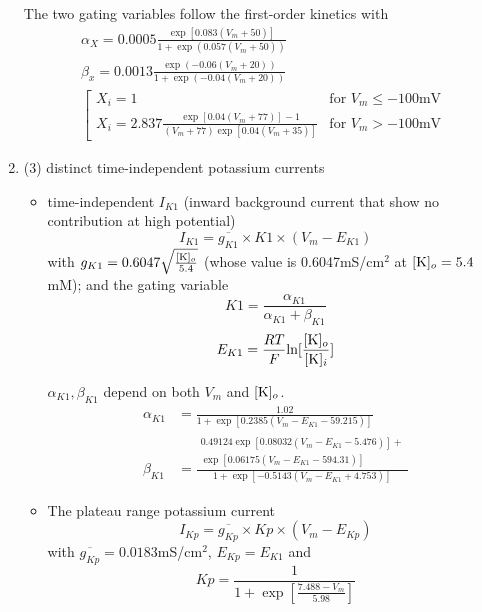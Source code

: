 \begin{enumerate}
  The two gating variables follow the first-order kinetics with
  \begin{equation}
    \label{eq:749}
    \begin{split}
      \alpha_X = 0.0005
      \frac{\exp[0.083(V_m+50)]}{1+\exp(0.057(V_m+50))} \\
      \beta_x = 0.0013\frac{\exp(-0.06(V_m+20))}{1+\exp(-0.04(V_m+20))}
      \\
      \left[\begin{array}{cc}
          X_i = 1 & \text{for $V_m\le -100$mV} \\
          X_i = 2.837
          \frac{\exp[0.04(V_m+77)]-1}{(V_m+77)\exp[0.04(V_m+35)]} &
          \text{for $V_m>-100$mV}
        \end{array}\right.
    \end{split}
  \end{equation}

\item (3) distinct time-independent potassium currents
  \begin{itemize}
\item time-independent $I_{K1}$ (inward background current that show
  no contribution at high potential)
  \begin{equation}
    \label{eq:720}
    I_{K1} = \overline{g_{K1}} \times K1 \times (V_m-E_{K1})
  \end{equation}
  with $g_{K1}=0.6047\sqrt{\frac{[\ce{K}]_o}{5.4}}$ (whose value is
  0.6047mS/cm$^2$ at $[\ce{K}]_o=5.4$mM); and the gating variable
  \begin{equation}
    \label{eq:751}
    K1 = \frac{\alpha_{K1}}{\alpha_{K1}+\beta_{K1}}
  \end{equation}
  \begin{equation}
    \label{eq:750}
    E_{K1} = \frac{RT}{F} \ln[\frac{[\ce{K}]_o}{[\ce{K}]_i}]
  \end{equation}
  
 $\alpha_{K1},\beta_{K1}$ depend on both
  $V_m$ and $[\ce{K}]_o$.
  \begin{equation}
    \label{eq:768}
    \begin{split}
      \alpha_{K1} &= \frac{1.02}{1+\exp[0.2385(V_m-E_{K1}-59.215)]} \\
      \beta_{K1} &= \frac{
        \begin{array}{c}
          0.49124\exp[0.08032(V_m-E_{K1}-5.476)] + \\
          \exp[0.06175(V_m-E_{K1}-594.31)]
        \end{array}
}{1+\exp[-0.5143(V_m-E_{K1}+4.753)]}
    \end{split}
  \end{equation}
\item  The plateau range potassium current
 \begin{equation}
    \label{eq:721}
    I_{Kp} = \overline{g_{Kp}} \times Kp \times (V_m - E_{Kp})
\end{equation}
with $\overline{g_{Kp}}=0.0183$mS/cm$^2$, $E_{Kp}=E_{K1}$ and
\begin{equation}
  \label{eq:752}
  Kp = \frac{1}{1+\exp[\frac{7.488-V_m}{5.98}]}
\end{equation}


\end{itemize}
\end{enumerate}
